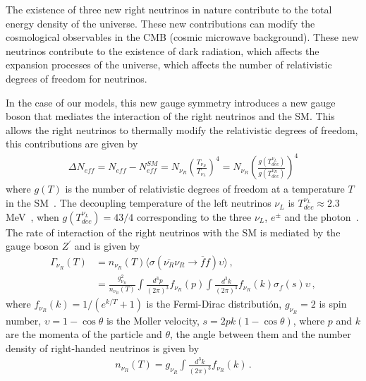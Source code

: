 \documentclass[12pt]{article}
\begin{document}
The existence of three new right neutrinos in nature contribute to the total energy density of the universe. These new contributions can modify the cosmological observables in the CMB (cosmic microwave background). These new neutrinos contribute to the existence of dark radiation, which affects the expansion processes of the universe, which affects the number of relativistic degrees of freedom for neutrinos.

In the case of our models, this new gauge symmetry introduces a new gauge boson that mediates the interaction of the right neutrinos and the SM. This allows the right neutrinos to thermally modify the relativistic degrees of freedom, this contributions are given by~\cite{Anchordoqui:2012qu, Anchordoqui:2011nh}
%
\begin{align*}
    \Delta N_{eff} = N_{eff} - N^{SM}_{eff} = N_{\nu_R} \left( \frac{T_{\nu_{R}}}{T_{\nu_{L}}} \right)^{4} = N_{\nu_R} \left( \frac{g(T^{\nu_{L}}_{dec})}{g(T^{\nu_{R}}_{dec})} \right)^{4}
\end{align*}
%
where $ g(T) $ is the number of relativistic degrees of freedom at a temperature $T$ in the SM~\cite{Aghanim:2018eyx}. The decoupling temperature of the left neutrinos $\nu_L$ is $ T^{\nu_{L}}_{dec} \approx 2.3 $ MeV~\cite{Enqvist:1991gx}, when $g(T^{\nu_{L}}_{ dec}) = 43/4 $ corresponding to the three $\nu_{L}$, $e^{\pm} $ and the photon~\cite{Kolb:1990vq}. The rate of interaction of the right neutrinos with the SM is mediated by the gauge boson $Z^{\prime} $ and is given by~\cite{SolagurenBeascoa:2012cz}
%
\begin{align*}
    \Gamma_{\nu_R} (T) &= n_{\nu_R}(T) \langle \sigma(\overline{\nu_{R}} \nu_{R} \to \overline{f} f) \upsilon \rangle \,, \\
    &= \frac{g^{2}_{\nu_R}}{n_{\nu_R}(T)} \int \frac{d^{3} p}{(2 \pi)^{3}} f_{\nu_R}(p) \int \frac{d^{3} k}{(2 \pi)^{3}} f_{\nu_R}(k) \sigma_{f}(s) \upsilon\,,
\end{align*}
%
where $f_{\nu_R}(k)=1/(e^{k/T}+1)$ is the Fermi-Dirac distributión, $g_{\nu_R} = 2$ is spin number, $\upsilon = 1-\cos{\theta}$ is the Moller velocity, $s = 2 p k (1-\cos{\theta})$, where $p$ and $k$ are the momenta of the particle and $\theta$, the angle between them and the number density of right-handed neutrinos is given by
\begin{align*}
n_{\nu_R}(T) = g_{\nu_R} \int \frac{d^{3} k}{(2 \pi)^{3}} f_{\nu_R}(k)\,.
\end{align*}
\end{document}
